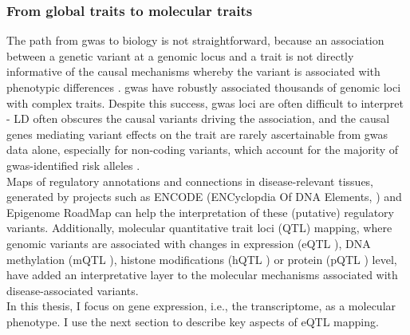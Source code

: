 
\subsubsection{From global traits to molecular traits}

The path from \gls{gwas} to biology is not straightforward, because an association between a genetic variant at a genomic locus and a trait is not directly informative of the causal mechanisms whereby the variant is associated with phenotypic differences \cite{visscher201710}. 
\gls{gwas} have robustly associated thousands of genomic loci with complex traits. 
Despite this success, \gls{gwas} loci are often difficult to interpret - LD often obscures the causal variants driving the association, and the causal genes mediating variant effects on the trait are rarely ascertainable from \gls{gwas} data alone, especially for non-coding variants, which account for the majority of \gls{gwas}-identified risk alleles \cite{manolio2009finding, gallagher2018post, wainberg2019opportunities}. \\

Maps of regulatory annotations and connections in disease-relevant tissues, generated by projects such as ENCODE (ENCyclopdia Of DNA Elements, \cite{encode2004encode}) and Epigenome RoadMap \cite{kundaje2015integrative} can help the interpretation of these (putative) regulatory variants.
Additionally, molecular quantitative trait loci (QTL) mapping, where genomic variants are associated with changes in expression (eQTL \cite{schadt2003genetics}), DNA methylation (mQTL \cite{gaunt2016systematic}), histone modifications (hQTL \cite{grubert2015genetic}) or protein (pQTL \cite{melzer2008genome}) level, have added an interpretative layer to the molecular mechanisms associated with disease-associated variants.\\

In this thesis, I focus on gene expression, i.e., the transcriptome, as a molecular phenotype.
I use the next section to describe key aspects of eQTL mapping.


